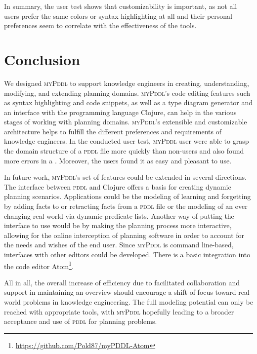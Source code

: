 \documentclass[runningheads]{llncs}
\newcommand{\mypddl}{\textsc{myPddl}\xspace}
\newcommand{\pddl}{\textsc{pddl}\xspace}
\begin{document}
In summary, the user test shows that customizability is important, as
not all users prefer the same colors or syntax highlighting at all and
their personal preferences seem to correlate with the effectiveness of
the tools.

\section{Conclusion}
\label{sec:conclusion}

We designed \mypddl to support knowledge engineers in creating,
understanding, modifying, and extending planning domains. \mypddl's
code editing features such as syntax highlighting and code snippets,
as well as a type diagram generator and an interface with the
programming language Clojure, can help in the various stages of
working with planning domains. \mypddl's extensible and customizable
architecture helps to fulfill the different preferences and
requirements of knowledge engineers. In the conducted user test,
\mypddl user were able to grasp the domain structure of a \pddl file
more quickly than non-users and also found more errors in a
. Moreover, the users found it as easy and pleasant to use.

In future work, \mypddl's set of features could be extended in several
directions. The interface between \pddl and Clojure offers a basis
for creating dynamic planning scenarios. Applications could be the
modeling of learning and forgetting by adding facts to or retracting
facts from a \pddl file or the modeling of an ever changing real world
via dynamic predicate lists. Another way of putting the interface to
use would be by making the planning process more interactive, allowing
for the online interception of planning software in order to account
for the needs and wishes of the end user. Since \mypddl is command
line-based, interfaces with other editors could be developed. There is
a basic integration into the code editor
Atom\footnote{\url{https://github.com/Pold87/myPDDL-Atom}}.

All in all, the overall increase of efficiency due to facilitated
collaboration and support in maintaining an overview should encourage
a shift of focus toward real world problems in knowledge
engineering. The full modeling potential can only be reached with
appropriate tools, with \mypddl hopefully leading to a broader
acceptance and use of \pddl for planning problems.



\end{document}
